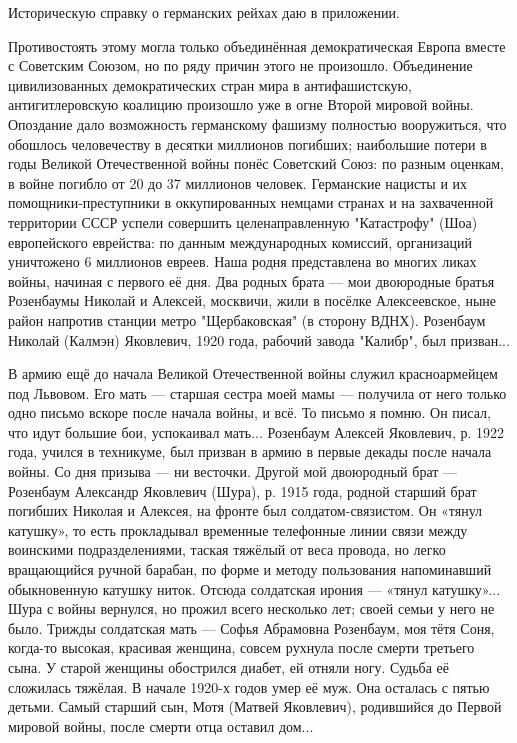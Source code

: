 Историческую справку о германских рейхах даю в приложении.


\label{27-1}
Противостоять этому могла только объединённая демократическая Европа вместе с Советским Союзом, но по ряду причин этого не произошло. Объединение цивилизованных демократических стран мира в антифашистскую, антигитлеровскую коалицию произошло уже в огне Второй мировой войны. Опоздание дало возможность германскому фашизму полностью вооружиться, что обошлось человечеству в десятки миллионов погибших; наибольшие потери в годы Великой Отечественной войны понёс Советский Союз: по разным оценкам, в войне погибло от 20 до 37 миллионов человек. Германские нацисты и их помощники-преступники в оккупированных немцами странах и на захваченной территории СССР успели совершить целенаправленную "Катастрофу" (Шоа) европейского еврейства: по данным международных комиссий, организаций уничтожено 6 миллионов евреев. Наша родня представлена во многих ликах войны, начиная с первого её дня. Два родных брата — мои двоюродные братья Розенбаумы Николай и Алексей, москвичи, жили в посёлке Алексеевское, ныне район напротив станции метро "Щербаковская" (в сторону ВДНХ). Розенбаум Николай (Калмэн) Яковлевич, 1920 года, рабочий завода "Калибр", был призван...

\label{28-1}
В армию ещё до начала Великой Отечественной войны служил красноармейцем под Львовом. Его мать — старшая сестра моей мамы — получила от него только одно письмо вскоре после начала войны, и всё. То письмо я помню. Он писал, что идут большие бои, успокаивал мать... Розенбаум Алексей Яковлевич, р. 1922 года, учился в техникуме, был призван в армию в первые декады после начала войны. Со дня призыва — ни весточки. Другой мой двоюродный брат — Розенбаум Александр Яковлевич (Шура), р. 1915 года, родной старший брат погибших Николая и Алексея, на фронте был солдатом-связистом. Он «тянул катушку», то есть прокладывал временные телефонные линии связи между воинскими подразделениями, таская тяжёлый от веса провода, но легко вращающийся ручной барабан, по форме и методу пользования напоминавший обыкновенную катушку ниток. Отсюда солдатская ирония — «тянул катушку»... Шура с войны вернулся, но прожил всего несколько лет; своей семьи у него не было. Трижды солдатская мать — Софья Абрамовна Розенбаум, моя тётя Соня, когда-то высокая, красивая женщина, совсем рухнула после смерти третьего сына. У старой женщины обострился диабет, ей отняли ногу. Судьба её сложилась тяжёлая. В начале 1920-х годов умер её муж. Она осталась с пятью детьми. Самый старший сын, Мотя (Матвей Яковлевич), родившийся до Первой мировой войны, после смерти отца оставил дом...


